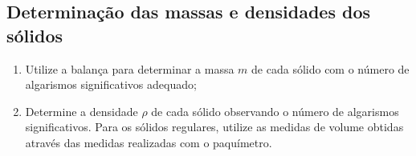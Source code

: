 \subsection{Determinação das massas e densidades dos sólidos}

\begin{enumerate}
     \item Utilize a balança para determinar a massa $m$ de cada sólido com o número de algarismos significativos adequado;
     \item Determine a densidade $\rho$ de cada sólido observando o número de algarismos significativos. Para os sólidos regulares, utilize as medidas de volume obtidas através das medidas realizadas com o paquímetro.
\end{enumerate}

\cleardoublepage


\vspace{15mm}

\begin{fullwidth}
\noindent{}
\vspace{5mm}

\noindent{}

\noindent{}

\noindent{}

\noindent{}

\noindent{}
\end{fullwidth}

